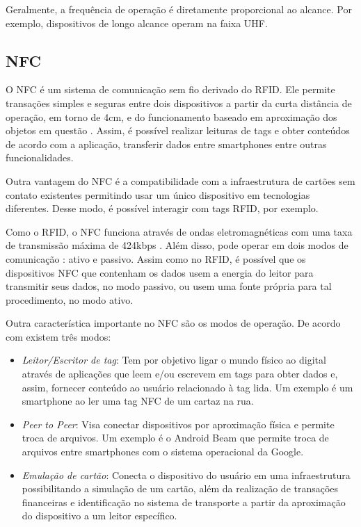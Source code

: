 Geralmente, a frequência de operação é diretamente proporcional ao alcance. Por exemplo, 
dispositivos de longo alcance operam na faixa UHF. 






\subsection{NFC}
O NFC é um sistema de comunicação sem fio derivado do RFID. Ele permite transações simples e 
seguras entre dois dispositivos a partir da curta distância de operação, em torno de 
4cm, e do funcionamento baseado em aproximação dos objetos em questão \cite{nfcforumabout2017}. 
Assim, é 
possível realizar leituras de tags e obter conteúdos de acordo com a aplicação, transferir dados 
entre smartphones entre outras funcionalidades.

Outra vantagem do NFC é a compatibilidade com a infraestrutura de cartões sem contato 
existentes permitindo usar um único dispositivo em tecnologias diferentes. Desse modo, é possível 
interagir com tags RFID, por exemplo.


Como o RFID, o NFC funciona através de ondas eletromagnéticas com uma taxa de transmissão máxima de 
424kbps \cite{nfcforumabout2017}. Além disso, pode operar em dois modos de comunicação 
\cite{brianjepsondoncolemantomigoe2014}: ativo e passivo. Assim como no RFID, é possível que os 
dispositivos NFC que contenham os dados usem a energia do leitor para transmitir seus dados, no 
modo passivo, ou usem uma fonte própria para tal procedimento, no modo ativo.


Outra característica importante no NFC são os modos de operação. De acordo com 
\cite{nfcforumabout2017} existem três modos:

\begin{itemize} \parskip -4pt
	\item \textit{Leitor/Escritor de tag}: Tem por objetivo ligar o mundo físico ao digital através 
	de aplicações que leem e/ou escrevem em tags para obter dados e, assim, fornecer conteúdo ao 
	usuário relacionado à tag lida. Um exemplo é um smartphone ao ler uma tag NFC de um cartaz na 
	rua.
	\item \textit{Peer to Peer}: Visa conectar dispositivos por aproximação física e permite troca 
	de arquivos. Um exemplo é o Android Beam que permite troca de arquivos entre smartphones com o 
	sistema operacional da Google.
	\item \textit{Emulação de cartão}: Conecta o dispositivo do usuário em uma infraestrutura 
	possibilitando a simulação de um cartão, além da realização de transações financeiras e 
	identificação no sistema de transporte a partir da aproximação do dispositivo a um leitor 
	específico.
\end{itemize}


